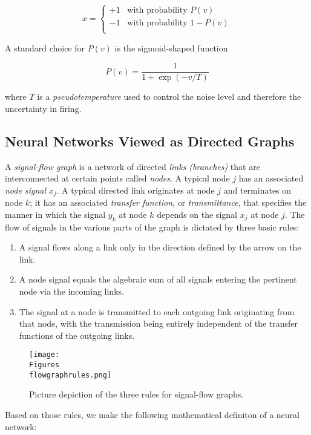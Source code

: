 \documentclass[twocolumn]{article}
\begin{document}
	 $$x =
		 \begin{cases}
			 +1 \;\;\; \text{with probability } P (v)     \\
			 -1 \;\;\; \text{with probability } 1 - P (v) \\
		 \end{cases}
	 $$

	 A standard choice for $ P (v) $ is the sigmoid-shaped function

	 $$ P (v) = \dfrac{1}{1 + \exp (-v / T)} $$

	 \noindent where $ T $ is a \textit{pseudotemperature} used to control the noise level and therefore the uncertainty in firing.

 \subsection{Neural Networks Viewed as Directed Graphs}

	 A \textit{signal-flow graph} is a network of directed \textit{links (branches)} that are interconnected at certain points called \textit{nodes}. A typical node $ j $ has an associated \textit{node signal} $ x_j $. A typical directed link originates at node $ j $ and terminates on node $ k $; it has an associated \textit{transfer function}, or \textit{transmittance}, that specifies the manner in which the signal $ y_k $ at node $ k $ depends on the signal $ x_j $ at node $ j $. The flow of signals in the various parts of the graph is dictated by three basic rules:

	 \begin{enumerate}
		 \item A signal flows along a link only in the direction defined by the arrow on the link.
		 \item A node signal equals the algebraic sum of all signals entering the pertinent node via the incoming links.
		 \item The signal at a node is transmitted to each outgoing link originating from that node, with the transmission being entirely independent of the transfer functions of the outgoing links.
	 \end{enumerate}

	 \begin{figure}
		 \center
		 \texttt{[image: \\Figures\\flowgraphrules.png]}
		 \caption{Picture depiction of the three rules for signal-flow graphs.}
		 \label{flowgraphrules}
	 \end{figure}

	 Based on those rules, we make the following mathematical definiton of a neural network:
\end{document}
